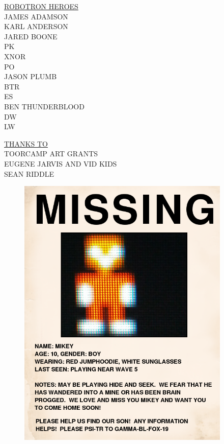 \documentclass{amsbook}
\begin{document}
\clearpage
\begin{center}
    {
        \ROBOFONT    \underline{ROBOTRON HEROES} \\
    \vspace{22pt}
    JAMES ADAMSON\\
    \vspace{2pt}
    KARL ANDERSON\\
    \vspace{2pt}
    JARED BOONE\\
    \vspace{2pt}
    PK\\
    \vspace{2pt}
    XNOR\\
    \vspace{2pt}
    PO\\
    \vspace{2pt}
    JASON PLUMB\\
    \vspace{2pt}
    BTR\\
    \vspace{2pt}
    ES\\
    \vspace{2pt}
    BEN THUNDERBLOOD\\
    \vspace{2pt}
    DW\\
    \vspace{2pt}
    LW\\}

    \vspace{32pt}
    {\ROBOFONTy    \underline{THANKS TO} \\
    \vspace{12pt}
    TOORCAMP ART GRANTS\\
    \vspace{2pt}
    EUGENE JARVIS AND VID KIDS\\
    \vspace{2pt}
    SEAN RIDDLE
    }
\end{center}
\clearpage

\begin{figure}[h]
  \includegraphics[width=4in]{../missing01.png}
\end{figure}
\end{document}

